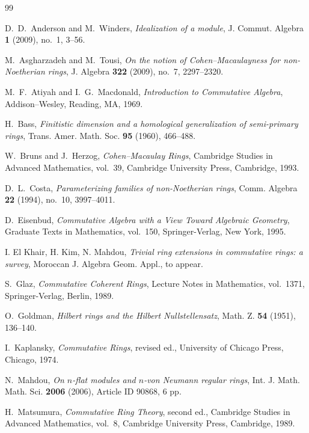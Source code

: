 \documentclass[11pt]{amsart}
\numberwithin{equation}{section}
\theoremstyle{definition}
\theoremstyle{remark}
\begin{document}
\begin{thebibliography}{99}

D.~D.~Anderson and M.~Winders,
\emph{Idealization of a module},
J. Commut. Algebra \textbf{1} (2009), no.~1, 3--56.

M.~Asgharzadeh and M.~Tousi,
\emph{On the notion of Cohen--Macaulayness for non-Noetherian rings},
J. Algebra \textbf{322} (2009), no.~7, 2297--2320.

M.~F.~Atiyah and I.~G.~Macdonald,
\emph{Introduction to Commutative Algebra},
Addison--Wesley, Reading, MA, 1969.

H.~Bass,
\emph{Finitistic dimension and a homological generalization of semi-primary rings},
Trans. Amer. Math. Soc. \textbf{95} (1960), 466--488.

W.~Bruns and J.~Herzog,
\emph{Cohen--Macaulay Rings},
Cambridge Studies in Advanced Mathematics, vol.~39,
Cambridge University Press, Cambridge, 1993.

D.~L.~Costa,
\emph{Parameterizing families of non-Noetherian rings},
Comm. Algebra \textbf{22} (1994), no.~10, 3997--4011.

D.~Eisenbud,
\emph{Commutative Algebra with a View Toward Algebraic Geometry},
Graduate Texts in Mathematics, vol.~150,
Springer-Verlag, New York, 1995.

 I. El Khair, H. Kim, N. Mahdou, \emph{Trivial ring extensions in commutative rings: a survey}, Moroccan J. Algebra Geom. Appl., to appear.

S.~Glaz,
\emph{Commutative Coherent Rings},
Lecture Notes in Mathematics, vol.~1371,
Springer-Verlag, Berlin, 1989.

O.~Goldman,
\emph{Hilbert rings and the Hilbert Nullstellensatz},
Math. Z. \textbf{54} (1951), 136--140.

I.~Kaplansky,
\emph{Commutative Rings}, revised ed.,
University of Chicago Press, Chicago, 1974.

N.~Mahdou,
\emph{On $n$-flat modules and $n$-von Neumann regular rings},
Int. J. Math. Math. Sci. \textbf{2006} (2006),
Article ID 90868, 6 pp.

H.~Matsumura,
\emph{Commutative Ring Theory}, second ed.,
Cambridge Studies in Advanced Mathematics, vol.~8,
Cambridge University Press, Cambridge, 1989.


\end{thebibliography}
\end{document}
